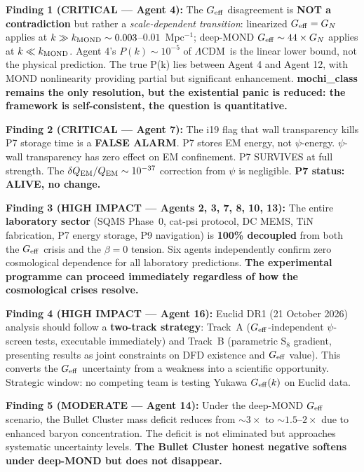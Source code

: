 \documentclass[11pt]{article}
\newcommand{\Geff}{G_{\rm eff}}
\newcommand{\LCDM}{$\Lambda$CDM}
\theoremstyle{remark}
\begin{document}
\begin{tcolorbox}[colback=red!5!white, colframe=red!80!black, breakable,
  title=\textbf{W4i20 TOP 5 FINDINGS --- CRISIS-MODE COMPILATION}]

\textbf{Finding 1 (CRITICAL --- Agent 4):} The $\Geff$ disagreement is
\textbf{NOT a contradiction} but rather a \emph{scale-dependent transition}: linearized
$\Geff = G_N$ applies at $k \gg k_{\rm MOND} \sim 0.003$--$0.01$~Mpc$^{-1}$;
deep-MOND $\Geff \sim 44 \times G_N$ applies at $k \ll k_{\rm MOND}$. Agent 4's
$P(k) \sim 10^{-5}$ of \LCDM\ is the linear lower bound, not the physical prediction.
The true P(k) lies between Agent 4 and Agent 12, with MOND nonlinearity providing
partial but significant enhancement. \textbf{mochi\_class remains the only resolution,
but the existential panic is reduced: the framework is self-consistent, the question
is quantitative.}

\medskip
\textbf{Finding 2 (CRITICAL --- Agent 7):} The i19 flag that wall transparency kills
P7 storage time is a \textbf{FALSE ALARM}. P7 stores EM energy, not $\psi$-energy.
$\psi$-wall transparency has zero effect on EM confinement. P7 SURVIVES at full
strength. The $\delta Q_{\rm EM}/Q_{\rm EM} \sim 10^{-37}$ correction from $\psi$
is negligible. \textbf{P7 status: ALIVE, no change.}

\medskip
\textbf{Finding 3 (HIGH IMPACT --- Agents 2, 3, 7, 8, 10, 13):} The entire
\textbf{laboratory sector} (SQMS Phase~0, cat-psi protocol, DC MEMS, TiN fabrication,
P7 energy storage, P9 navigation) is \textbf{100\% decoupled} from both the $\Geff$
crisis and the $\beta = 0$ tension. Six agents independently confirm zero cosmological
dependence for all laboratory predictions. \textbf{The experimental programme can
proceed immediately regardless of how the cosmological crises resolve.}

\medskip
\textbf{Finding 4 (HIGH IMPACT --- Agent 16):} Euclid DR1 (21 October 2026) analysis
should follow a \textbf{two-track strategy}: Track~A ($\Geff$-independent $\psi$-screen
tests, executable immediately) and Track~B (parametric S$_8$ gradient, presenting results
as joint constraints on DFD existence and $\Geff$ value). This converts the $\Geff$
uncertainty from a weakness into a scientific opportunity. Strategic window: no competing
team is testing Yukawa $\Geff(k)$ on Euclid data.

\medskip
\textbf{Finding 5 (MODERATE --- Agent 14):} Under the deep-MOND $\Geff$ scenario, the
Bullet Cluster mass deficit reduces from $\sim 3\times$ to $\sim 1.5$--$2\times$ due to
enhanced baryon concentration. The deficit is not eliminated but approaches systematic
uncertainty levels. \textbf{The Bullet Cluster honest negative softens under deep-MOND
but does not disappear.}

\end{tcolorbox}
\end{document}
